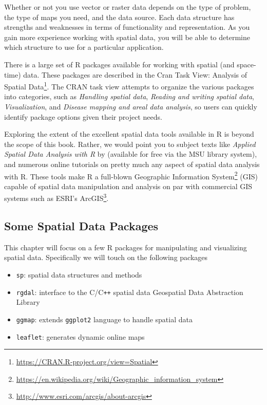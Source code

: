 \documentclass[]{krantz}
\providecommand{\tightlist}{%
  \setlength{\itemsep}{0pt}\setlength{\parskip}{0pt}}
\renewcommand{\href}[2]{#2\footnote{\url{#1}}}
\begin{document}
Whether or not you use vector or raster data depends on the type of
problem, the type of maps you need, and the data source. Each data
structure has strengths and weaknesses in terms of functionality and
representation. As you gain more experience working with spatial data,
you will be able to determine which structure to use for a particular
application.

There is a large set of R packages available for working with spatial
(and space-time) data. These packages are described in the
\href{https://CRAN.R-project.org/view=Spatial}{Cran Task View: Analysis
of Spatial Data}. The CRAN task view attempts to organize the various
packages into categories, such as \emph{Handling spatial data},
\emph{Reading and writing spatial data}, \emph{Visualization}, and
\emph{Disease mapping and areal data analysis}, so users can quickly
identify package options given their project needs.

Exploring the extent of the excellent spatial data tools available in R
is beyond the scope of this book. Rather, we would point you to subject
texts like \emph{Applied Spatial Data Analysis with R} by
\citet{Bivand13} (available for free via the MSU library system), and
numerous online tutorials on pretty much any aspect of spatial data
analysis with R. These tools make R a full-blown
\href{https://en.wikipedia.org/wiki/Geographic_information_system}{Geographic
Information System} (GIS) capable of spatial data manipulation and
analysis on par with commercial GIS systems such as
\href{http://www.esri.com/arcgis/about-arcgis}{ESRI's ArcGIS}.

\subsection{Some Spatial Data
Packages}\label{some-spatial-data-packages}

This chapter will focus on a few R packages for manipulating and
visualizing spatial data. Specifically we will touch on the following
packages

\begin{itemize}
\tightlist
\item
  \texttt{sp}: spatial data structures and methods
\item
  \texttt{rgdal}: interface to the C/C\texttt{++} spatial data
  Geospatial Data Abstraction Library
\item
  \texttt{ggmap}: extends \texttt{ggplot2} language to handle spatial
  data
\item
  \texttt{leaflet}: generates dynamic online maps
\end{itemize}
\end{document}
